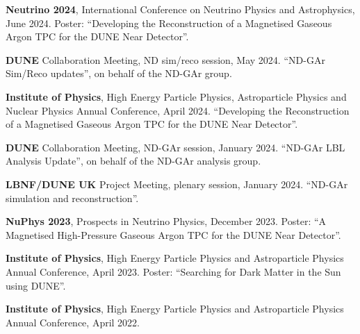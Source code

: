 \begin{list}{\scalebox{0.7}{$\square$}}{\leftmargin=1em \itemindent=0em}
	\item \textbf{Neutrino 2024}, International Conference on Neutrino Physics and Astrophysics, June 2024. \newline Poster: ``Developing the Reconstruction of a Magnetised Gaseous Argon TPC for the DUNE Near Detector''.
	\item \textbf{DUNE} Collaboration Meeting, ND sim/reco session, May 2024. \newline ``ND-GAr Sim/Reco updates'', on behalf of the ND-GAr group.
	\item \textbf{Institute of Physics}, High Energy Particle Physics, Astroparticle Physics and Nuclear Physics Annual Conference, April 2024. \newline ``Developing the Reconstruction of a Magnetised Gaseous Argon TPC for the DUNE Near Detector''.
	\item \textbf{DUNE} Collaboration Meeting, ND-GAr session, January 2024. \newline ``ND-GAr LBL Analysis Update'', on behalf of the ND-GAr analysis group.
	\item \textbf{LBNF/DUNE UK} Project Meeting, plenary session, January 2024. \newline ``ND-GAr simulation and reconstruction''.
	\item \textbf{NuPhys 2023}, Prospects in Neutrino Physics, December 2023. \newline Poster: ``A Magnetised High-Pressure Gaseous Argon TPC for the DUNE Near Detector''.
	\item \textbf{Institute of Physics}, High Energy Particle Physics and Astroparticle Physics Annual Conference, April 2023. \newline Poster: ``Searching for Dark Matter in the Sun using DUNE''.
	\item \textbf{Institute of Physics}, High Energy Particle Physics and Astroparticle Physics Annual Conference, April 2022.
\end{list}

